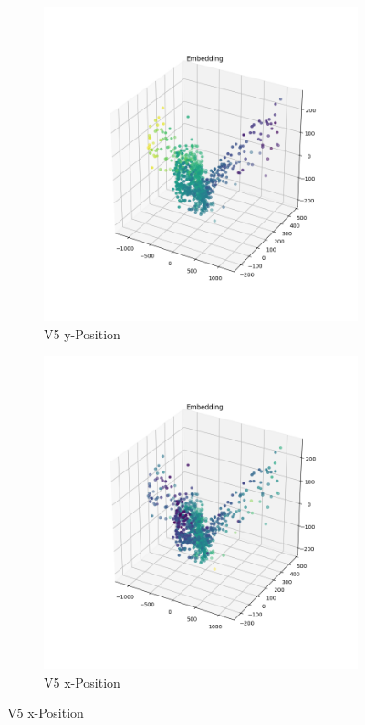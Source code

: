 \begin{figure}[h]
\begin{subfigure}[c]{0.49\textwidth}			
	\includegraphics[width=1\textwidth,center]{bilder/Hauptteil/MT_Grapple/EMB_alle/5_Embedding_y.png}
	\caption{V5 y-Position}
	\label{img:Einbettung5_y}	
\end{subfigure}
\centering
\begin{subfigure}[c]{0.49\textwidth}			
	\includegraphics[width=1\textwidth,center]{bilder/Hauptteil/MT_Grapple/EMB_alle/5_Embedding_x.png}
	\caption{V5 x-Position}
	\label{img:Einbettung5_x}		
\end{subfigure}


\end{figure}
